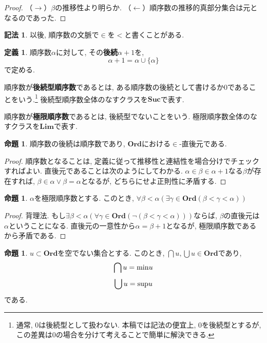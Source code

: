 \documentclass[a4paper, twoside]{bxjsarticle}
\theoremstyle{definition}
\newtheorem{prop}[thm]{命題}
\newtheorem{defn}[thm]{定義}
\newtheorem{notation}[thm]{記法}
\begin{document}
        \begin{proof}
            （$\rightarrow$）$\beta$の推移性より明らか.
            （$\leftarrow$）順序数の推移的真部分集合は元となるのであった.
        \end{proof}
        \begin{notation}
            以後, 順序数の文脈で$\in$を$<$と書くことがある.
        \end{notation}
        \begin{defn}
            順序数$\alpha$に対して, その\textbf{後続}$\alpha+1$を, \[\alpha+1 = \alpha \cup \{\alpha\}\]で定める.
            
            順序数が\textbf{後続型順序数}であるとは, ある順序数の後続として書けるか0であることをいう.\footnote{通常, 0は後続型として扱わない. 本稿では記法の便宜上, 0を後続型とするが, この差異は0の場合を分けて考えることで簡単に解決できる.} 後続型順序数全体のなすクラスを$\textbf{Suc}$で表す.
            
            順序数が\textbf{極限順序数}であるとは, 後続型でないことをいう. 極限順序数全体のなすクラスを$\textbf{Lim}$で表す.
        \end{defn}
        \begin{prop}
            順序数の後続は順序数であり, $\textbf{Ord}$における$\in$-直後元である.
        \end{prop}
        \begin{proof}
            順序数となることは, 定義に従って推移性と連結性を場合分けでチェックすればよい. 直後元であることは次のようにしてわかる. $\alpha\in\beta\in\alpha+1$なる$\beta$が存在すれば, $\beta\in\alpha\lor\beta=\alpha$となるが, どちらにせよ正則性に矛盾する.
        \end{proof}
        \begin{prop}
            $\alpha$を極限順序数とする. このとき, $\forall \beta<\alpha(\exists \gamma\in\textbf{Ord}(\beta<\gamma<\alpha))$
        \end{prop}
        \begin{proof}
            背理法. もし$\exists \beta<\alpha(\forall \gamma\in\textbf{Ord}(\lnot (\beta<\gamma<\alpha)))$ならば, $\beta$の直後元は$\alpha$ということになる. 直後元の一意性から$\alpha = \beta+1$となるが, 極限順序数であるから矛盾である.
        \end{proof}
        \begin{prop}
            $u\subset\textbf{Ord}$を空でない集合とする. このとき, $\bigcap u, \bigcup u\in \textbf{Ord}$であり, \[\bigcap u = {\rm min}u\]\[\bigcup u = {\rm sup}u\]である.
        \end{prop}
\end{document}
